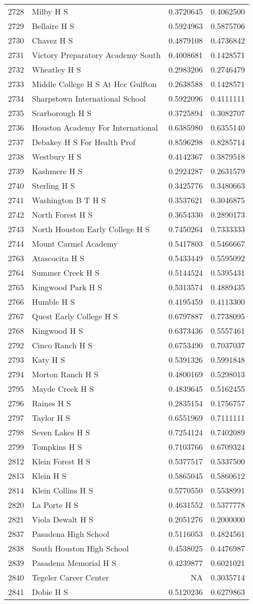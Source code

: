 \documentclass[
]{article}
\begin{document}
\begin{longtable}[]{@{}llrr@{}}
2728 & Milby H S & 0.3720645 & 0.4062500\tabularnewline
2729 & Bellaire H S & 0.5924963 & 0.5875706\tabularnewline
2730 & Chavez H S & 0.4879108 & 0.4736842\tabularnewline
2731 & Victory Preparatory Academy South & 0.4008681 &
0.1428571\tabularnewline
2732 & Wheatley H S & 0.2983206 & 0.2746479\tabularnewline
2733 & Middle College H S At Hcc Gulfton & 0.2638588 &
0.1428571\tabularnewline
2734 & Sharpstown International School & 0.5922096 &
0.4111111\tabularnewline
2735 & Scarborough H S & 0.3725894 & 0.3082707\tabularnewline
2736 & Houston Academy For International & 0.6385980 &
0.6355140\tabularnewline
2737 & Debakey H S For Health Prof & 0.8596298 &
0.8285714\tabularnewline
2738 & Westbury H S & 0.4142367 & 0.3879518\tabularnewline
2739 & Kashmere H S & 0.2924287 & 0.2631579\tabularnewline
2740 & Sterling H S & 0.3425776 & 0.3480663\tabularnewline
2741 & Washington B T H S & 0.3537621 & 0.3046875\tabularnewline
2742 & North Forest H S & 0.3654330 & 0.2890173\tabularnewline
2743 & North Houston Early College H S & 0.7450264 &
0.7333333\tabularnewline
2744 & Mount Carmel Academy & 0.5417803 & 0.5466667\tabularnewline
2763 & Atascocita H S & 0.5433449 & 0.5595092\tabularnewline
2764 & Summer Creek H S & 0.5144524 & 0.5395431\tabularnewline
2765 & Kingwood Park H S & 0.5313574 & 0.4889435\tabularnewline
2766 & Humble H S & 0.4195459 & 0.4113300\tabularnewline
2767 & Quest Early College H S & 0.6797887 & 0.7738095\tabularnewline
2768 & Kingwood H S & 0.6373436 & 0.5557461\tabularnewline
2792 & Cinco Ranch H S & 0.6753490 & 0.7037037\tabularnewline
2793 & Katy H S & 0.5391326 & 0.5991848\tabularnewline
2794 & Morton Ranch H S & 0.4800169 & 0.5298013\tabularnewline
2795 & Mayde Creek H S & 0.4839645 & 0.5162455\tabularnewline
2796 & Raines H S & 0.2835154 & 0.1756757\tabularnewline
2797 & Taylor H S & 0.6551969 & 0.7111111\tabularnewline
2798 & Seven Lakes H S & 0.7254124 & 0.7402089\tabularnewline
2799 & Tompkins H S & 0.7103766 & 0.6709324\tabularnewline
2812 & Klein Forest H S & 0.5377517 & 0.5337500\tabularnewline
2813 & Klein H S & 0.5865045 & 0.5860612\tabularnewline
2814 & Klein Collins H S & 0.5770550 & 0.5538991\tabularnewline
2820 & La Porte H S & 0.4631552 & 0.5377778\tabularnewline
2821 & Viola Dewalt H S & 0.2051276 & 0.2000000\tabularnewline
2837 & Pasadena High School & 0.5116053 & 0.4824561\tabularnewline
2838 & South Houston High School & 0.4538025 & 0.4476987\tabularnewline
2839 & Pasadena Memorial H S & 0.4239877 & 0.6021021\tabularnewline
2840 & Tegeler Career Center & NA & 0.3035714\tabularnewline
2841 & Dobie H S & 0.5120236 & 0.6279863\tabularnewline

\end{longtable}
\end{document}
